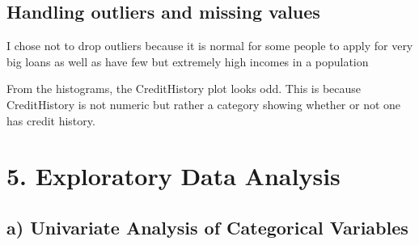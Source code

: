 \documentclass[
]{article}
\newenvironment{Shaded}{\begin{snugshade}}{\end{snugshade}}
\newcommand{\AttributeTok}[1]{\textcolor[rgb]{0.77,0.63,0.00}{#1}}
\newcommand{\CommentTok}[1]{\textcolor[rgb]{0.56,0.35,0.01}{\textit{#1}}}
\newcommand{\DecValTok}[1]{\textcolor[rgb]{0.00,0.00,0.81}{#1}}
\newcommand{\FunctionTok}[1]{\textcolor[rgb]{0.00,0.00,0.00}{#1}}
\newcommand{\NormalTok}[1]{#1}
\newcommand{\OtherTok}[1]{\textcolor[rgb]{0.56,0.35,0.01}{#1}}
\newcommand{\SpecialCharTok}[1]{\textcolor[rgb]{0.00,0.00,0.00}{#1}}
\newcommand{\StringTok}[1]{\textcolor[rgb]{0.31,0.60,0.02}{#1}}
\begin{document}
\hypertarget{handling-outliers-and-missing-values}{%
\subsection{Handling outliers and missing
values}\label{handling-outliers-and-missing-values}}

I chose not to drop outliers because it is normal for some people to
apply for very big loans as well as have few but extremely high incomes
in a population

From the histograms, the CreditHistory plot looks odd. This is because
CreditHistory is not numeric but rather a category showing whether or
not one has credit history.

\begin{Shaded}
\end{Shaded}

\hypertarget{exploratory-data-analysis}{%
\section{5. Exploratory Data Analysis}\label{exploratory-data-analysis}}

\hypertarget{a-univariate-analysis-of-categorical-variables}{%
\subsection{a) Univariate Analysis of Categorical
Variables}\label{a-univariate-analysis-of-categorical-variables}}

\begin{Shaded}
\end{Shaded}
\end{document}
